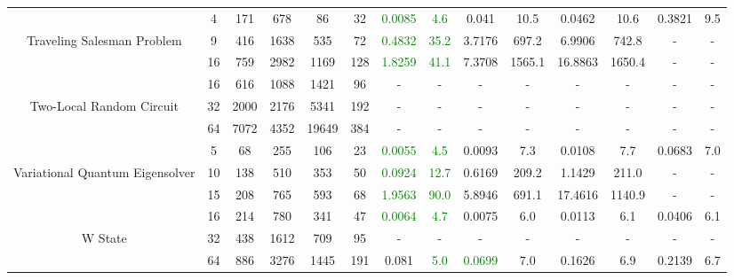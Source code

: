 \begin{table}[htb]
{\begin{tabular}{|c|c|c|c|c|c|c|c|c|c|c|c|c|c|}
\hline
 & 
4 & 171 & 678 & 86 & 32
 & \textcolor{green}{0.0085} & \textcolor{green}{4.6}
 & 0.041 & 10.5
 & 0.0462 & 10.6
 & 0.3821 & 9.5
 \\
Traveling Salesman Problem & 
9 & 416 & 1638 & 535 & 72
 & \textcolor{green}{0.4832} & \textcolor{green}{35.2}
 & 3.7176 & 697.2
 & 6.9906 & 742.8
 & - & -
 \\
 & 
16 & 759 & 2982 & 1169 & 128
 & \textcolor{green}{1.8259} & \textcolor{green}{41.1}
 & 7.3708 & 1565.1
 & 16.8863 & 1650.4
 & - & -
 \\
\hline
 & 
16 & 616 & 1088 & 1421 & 96
 & - & -
 & - & -
 & - & -
 & - & -
 \\
Two-Local Random Circuit & 
32 & 2000 & 2176 & 5341 & 192
 & - & -
 & - & -
 & - & -
 & - & -
 \\
 & 
64 & 7072 & 4352 & 19649 & 384
 & - & -
 & - & -
 & - & -
 & - & -
 \\
\hline
 & 
5 & 68 & 255 & 106 & 23
 & \textcolor{green}{0.0055} & \textcolor{green}{4.5}
 & 0.0093 & 7.3
 & 0.0108 & 7.7
 & 0.0683 & 7.0
 \\
Variational Quantum Eigensolver & 
10 & 138 & 510 & 353 & 50
 & \textcolor{green}{0.0924} & \textcolor{green}{12.7}
 & 0.6169 & 209.2
 & 1.1429 & 211.0
 & - & -
 \\
 & 
15 & 208 & 765 & 593 & 68
 & \textcolor{green}{1.9563} & \textcolor{green}{90.0}
 & 5.8946 & 691.1
 & 17.4616 & 1140.9
 & - & -
 \\
\hline
 & 
16 & 214 & 780 & 341 & 47
 & \textcolor{green}{0.0064} & \textcolor{green}{4.7}
 & 0.0075 & 6.0
 & 0.0113 & 6.1
 & 0.0406 & 6.1
 \\
W State & 
32 & 438 & 1612 & 709 & 95
 & - & -
 & - & -
 & - & -
 & - & -
 \\
 & 
64 & 886 & 3276 & 1445 & 191
 & 0.081 & \textcolor{green}{5.0}
 & \textcolor{green}{0.0699} & 7.0
 & 0.1626 & 6.9
 & 0.2139 & 6.7
 \\
\hline
\end{tabular}}
\end{table}